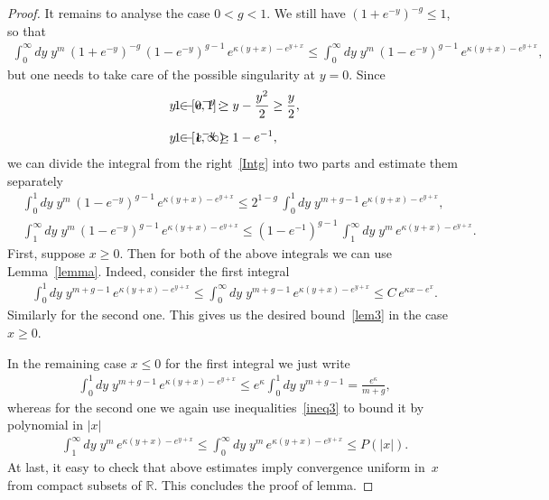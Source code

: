 \documentclass[11pt]{article}
\numberwithin{equation}{section}
\theoremstyle{plain}
\theoremstyle{definition}
\begin{document}
\begin{proof}
	It remains to analyse the case $0 < g <1$. We still have $(1 + e^{-y})^{- g} \leq 1$, so that
	\begin{align} \label{Intg}
		\int_{0}^\infty dy \; y^m  \, (1 + e^{-y})^{- g} \, (1 - e^{-y})^{g - 1} \, e^{\kappa (y + x) - e^{y + x}} \leq \int_{0}^\infty dy \; y^m  \,(1 - e^{-y})^{g - 1} \, e^{\kappa (y + x) - e^{y + x}},
	\end{align}
	but one needs to take care of the possible singularity at $y = 0$. Since
	\begin{align} \label{ey1}
		& y \in [0, 1]\colon && \hspace{-2cm} 1 - e^{-y} \geq y - \frac{y^2}{2} \geq \frac{y}{2}, \\[6pt] \label{ey2}
		& y \in [1, \infty) \colon &&  \hspace{-2cm} 1 - e^{-y} \geq 1 - e^{-1},
	\end{align}
	we can divide the integral from the right~\eqref{Intg} into two parts and estimate them separately
	\begin{align}
		& \int_{0}^1 dy \; y^m \, (1 - e^{-y})^{g - 1} \, e^{\kappa(y + x)- e^{y + x}} \leq 2^{1 - g} \, \int_0^1 dy \; y^{m + g - 1} \, e^{\kappa(y + x)- e^{y + x}}, \\[10pt]
		& \int_{1}^\infty dy \; y^m  \, (1 - e^{-y})^{g - 1} \, e^{\kappa(y + x)- e^{y + x}} \leq (1 - e^{-1})^{g - 1} \, \int_{1}^\infty dy \; y^m \, e^{\kappa(y + x)- e^{y + x}}.
	\end{align}
	First, suppose $x \geq 0$. Then for both of the above integrals we can use Lemma~\ref{lemma}. Indeed, consider the first integral
	\begin{align}
		\int_0^1 dy \; y^{m + g - 1} \, e^{\kappa(y + x)- e^{y + x}} \leq \int_0^\infty dy \; y^{m + g - 1} \, e^{\kappa(y + x)- e^{y + x}} \leq C \, e^{\kappa x -e^x}.
	\end{align}
	Similarly for the second one. This gives us the desired bound~\eqref{lem3} in the case $x \geq 0$.
	
	In the remaining case $x \leq 0$ for the first integral we just write
	\begin{align}
		\int_0^1 dy \; y^{m + g - 1} \, e^{\kappa(y + x)- e^{y + x}} \leq e^{\kappa} \int_0^1 dy \; y^{m + g - 1} = \frac{e^{\kappa} }{m + g},
	\end{align}
	whereas for the second one we again use inequalities~\eqref{ineq3} to bound it by polynomial in $|x|$
	\begin{align}
		\int_{1}^\infty dy \; y^m \, e^{\kappa(y + x)- e^{y + x}} \leq  \int_{0}^\infty dy \; y^m \, e^{\kappa (y + x)- e^{y + x}} \leq P(|x|).
	\end{align}
	At last, it easy to check that above estimates imply convergence uniform in~$x$ from compact subsets of $\mathbb{R}$.
	This concludes the proof of lemma.
\end{proof}
\end{document}

